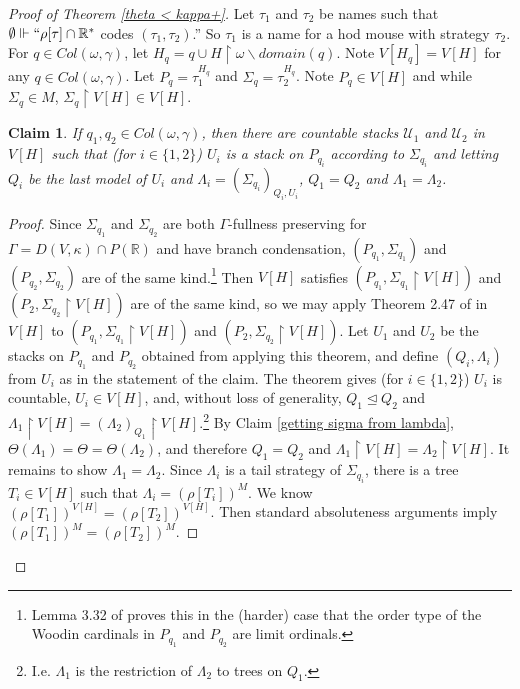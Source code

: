 \documentclass[12pt]{article}
\newtheorem{claim}[theorem]{Claim}
\newcommand\R{\mathbb{R}}
\newcommand\U{\mathcal{U}}
\begin{document}
\begin{proof}[Proof of Theorem \ref{theta < kappa+}]
    Let $\tau_1$ and $\tau_2$ be names such that $\emptyset \Vdash ``\rho[\tau] \cap \R^*$ codes $(\tau_1,\tau_2)$.'' So $\tau_1$ is a name for a hod mouse with strategy $\tau_2$. For $q\in Col(\omega,\gamma)$, let $H_q = q \cup H\upharpoonright \omega\backslash domain(q)$. Note $V[H_q] = V[H]$ for any $q\in Col(\omega,\gamma)$. Let $P_q = \tau_1^{H_q}$ and $\Sigma_q = \tau_2^{H_q}$. Note $P_q \in V[H]$ and while $\Sigma_q\in M$, $\Sigma_q\upharpoonright V[H] \in V[H]$.

    \begin{claim}
    \label{can coiterate}
        If $q_1,q_2\in Col(\omega,\gamma)$, then there are countable stacks $\U_1$ and $\U_2$ in $V[H]$ such that (for $i\in \{1,2\}$) $U_i$ is a stack on $P_{q_i}$ according to $\Sigma_{q_i}$ and letting $Q_i$ be the last model of $U_i$ and $\Lambda_i = (\Sigma_{q_i})_{Q_i,U_i}$, $Q_1 = Q_2$ and $\Lambda_1 = \Lambda_2$.
    \end{claim}
    \begin{proof}
        Since $\Sigma_{q_1}$ and $\Sigma_{q_2}$ are both $\Gamma$-fullness preserving for $\Gamma = D(V,\kappa) \cap P(\R)$ and have branch condensation, $(P_{q_1},\Sigma_{q_1})$ and $(P_{q_2},\Sigma_{q_2})$ are of the same kind.\footnote{Lemma 3.32 of \cite{hm&msc} proves this in the (harder) case that the order type of the Woodin cardinals in $P_{q_1}$ and $P_{q_2}$ are limit ordinals.} Then $V[H]$ satisfies $(P_{q_1},\Sigma_{q_1}\upharpoonright V[H])$ and $(P_2,\Sigma_{q_2}\upharpoonright V[H])$ are of the same kind, so we may apply Theorem 2.47 of \cite{hm&msc} in $V[H]$ to $(P_{q_1},\Sigma_{q_1}\upharpoonright V[H])$ and $(P_2,\Sigma_{q_2}\upharpoonright V[H])$. Let $U_1$ and $U_2$ be the stacks on $P_{q_1}$ and $P_{q_2}$ obtained from applying this theorem, and define $(Q_i,\Lambda_i)$ from $U_i$ as in the statement of the claim. The theorem gives (for $i\in\{1,2\}$) $U_i$ is countable, $U_i\in V[H]$, and, without loss of generality, $Q_1 \trianglelefteq Q_2$ and $\Lambda_1 \upharpoonright V[H] = (\Lambda_2)_{Q_1} \upharpoonright V[H]$.\footnote{I.e. $\Lambda_1$ is the restriction of $\Lambda_2$ to trees on $Q_1$.} By Claim \ref{getting sigma from lambda}, $\Theta(\Lambda_1) = \Theta = \Theta(\Lambda_2)$, and therefore $Q_1 = Q_2$ and $\Lambda_1 \upharpoonright V[H] = \Lambda_2 \upharpoonright V[H]$. It remains to show $\Lambda_1 = \Lambda_2$. Since $\Lambda_i$ is a tail strategy of $\Sigma_{q_i}$, there is a tree $T_i\in V[H]$ such that $\Lambda_i = (\rho[T_i])^{M}$. We know $(\rho[T_1])^{V[H]} = (\rho[T_2])^{V[H]}$. Then standard absoluteness arguments imply $(\rho[T_1])^{M} = (\rho[T_2])^{M}$.
    \end{proof}


\end{proof}
\end{document}
